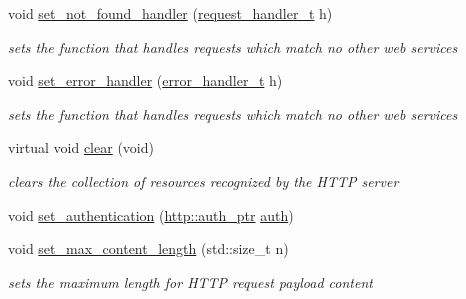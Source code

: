 \begin{DoxyCompactItemize}
void \hyperlink{classpion_1_1http_1_1server_a817a94e4117d2d8616c37b5f8d093e92}{set\-\_\-not\-\_\-found\-\_\-handler} (\hyperlink{classpion_1_1http_1_1server_a9a5ae02baccb5646a5a76b99dc44df6e}{request\-\_\-handler\-\_\-t} h)
\begin{DoxyCompactList}\small\item\em sets the function that handles requests which match no other web services \end{DoxyCompactList}\item 
void \hyperlink{classpion_1_1http_1_1server_ae88ab890a352b5bb389cbc8e6363e671}{set\-\_\-error\-\_\-handler} (\hyperlink{classpion_1_1http_1_1server_abc3b778d656bfb9dfa0b63315b5369f9}{error\-\_\-handler\-\_\-t} h)
\begin{DoxyCompactList}\small\item\em sets the function that handles requests which match no other web services \end{DoxyCompactList}\item 
virtual void \hyperlink{classpion_1_1http_1_1server_af7e7f7b23f1d90d1e1e7171a33b29d7b}{clear} (void)
\begin{DoxyCompactList}\small\item\em clears the collection of resources recognized by the H\-T\-T\-P server \end{DoxyCompactList}\item 
void \hyperlink{classpion_1_1http_1_1server_a5ccee5bdd4d7f59a348dd9475cba7ded}{set\-\_\-authentication} (\hyperlink{namespacepion_1_1http_ad4fb4365aa7da70980fe02dfb13773e4}{http\-::auth\-\_\-ptr} \hyperlink{classpion_1_1http_1_1auth}{auth})
\item 
void \hyperlink{classpion_1_1http_1_1server_acf80fa19484a66649c89cf9a23cc9251}{set\-\_\-max\-\_\-content\-\_\-length} (std\-::size\-\_\-t n)
\begin{DoxyCompactList}\small\item\em sets the maximum length for H\-T\-T\-P request payload content \end{DoxyCompactList}\end{DoxyCompactItemize}
